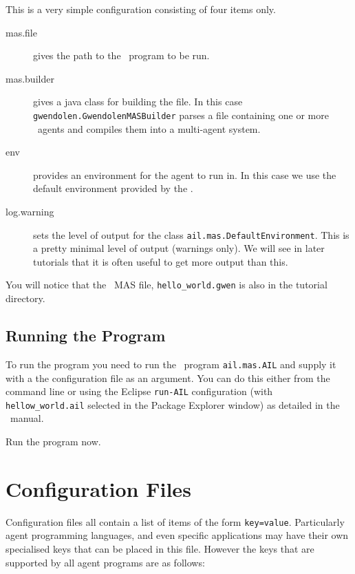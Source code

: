 \documentclass[a4]{article}
\begin{document}
This is a very simple configuration consisting of four items only.
\begin{description}
\item[mas.file] gives the path to the \gwendolen\ program to be run.
\item[mas.builder] gives a java class for building the file.  In this case \texttt{gwendolen.GwendolenMASBuilder} parses a file containing one or more \gwendolen\ agents and compiles them into a multi-agent system.
\item[env] provides an environment for the agent to run in.  In this case we use the default environment provided by the \ail.
\item[log.warning] sets the level of output for the class \texttt{ail.mas.DefaultEnvironment}.  This is a pretty minimal level of output (warnings only).  We will see in later tutorials that it is often useful to get more output than this.
\end{description}
You will notice that the \gwendolen\ MAS file, \texttt{hello\_world.gwen} is also in the tutorial directory.

\subsection{Running the Program}

To run the program you need to run the \java\ program \texttt{ail.mas.AIL} and supply it with a the configuration file as an argument.  You can do this either from the command line or using the Eclipse \texttt{run-AIL} configuration (with \texttt{hellow\_world.ail} selected in the Package Explorer window) as detailed in the \mcapl\ manual.

Run the program now.

\section{Configuration Files}

Configuration files all contain a list of items of the form \texttt{key=value}.  Particularly agent programming languages, and even specific applications may have their own specialised keys that can be placed in this file.  However the keys that are supported by all agent programs are as follows:
\end{document}
